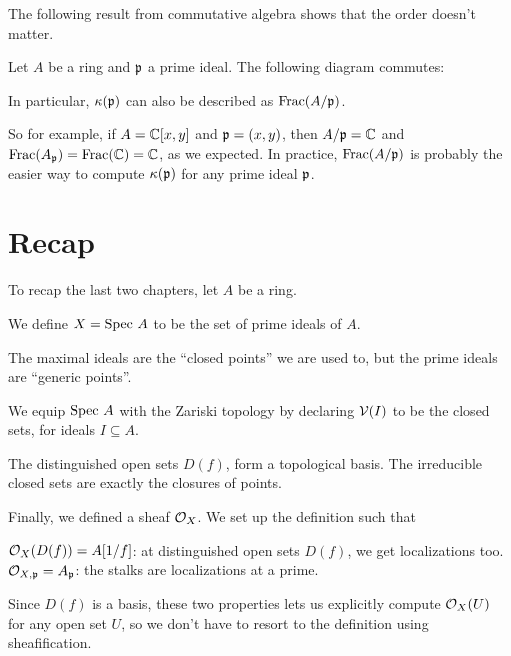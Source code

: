 The following result from commutative algebra
shows that the order doesn't matter.
\begin{theorem}
	Let $A$ be a ring and $\mathfrak p$ a prime ideal.
	The following diagram commutes:
	\begin{center}
	\end{center}
	In particular, $\kappa(\mathfrak p)$
	can also be described as $\operatorname{Frac}(A/\mathfrak p)$.
\end{theorem}
So for example, if $A = \mathbb C[x,y]$ and $\mathfrak p = (x,y)$,
then $A/\mathfrak p = \mathbb C$ and $\operatorname{Frac}(A_\mathfrak p) = \operatorname{Frac}(\mathbb C) = \mathbb C$, as we expected.
In practice, $\operatorname{Frac}(A/\mathfrak p)$ is probably the easier way
to compute $\kappa(\mathfrak p)$ for any prime ideal $\mathfrak p$.



\section{Recap}
To recap the last two chapters, let $A$ be a ring.
\begin{itemize}
	\ii We define $X = \text{Spec } A$ to be the set of prime ideals of $A$.
	\begin{itemize}
		\ii The maximal ideals are the ``closed points'' we are used to,
		but the prime ideals are ``generic points''.
	\end{itemize}

	\ii We equip $\text{Spec } A$ with the Zariski topology by declaring
	$\mathcal V(I)$ to be the closed sets, for ideals $I \subseteq A$.
	\begin{itemize}
		\ii The distinguished open sets $D(f)$,
		form a topological basis.
		\ii The irreducible closed sets are exactly the closures of points.
	\end{itemize}

	\ii Finally, we defined a sheaf $\mathcal O_X$.
	We set up the definition such that
	\begin{itemize}
		\ii $\mathcal O_{X}(D(f)) = A[1/f]$:
		at distinguished open sets $D(f)$,
		we get localizations too.
		\ii $\mathcal O_{X,\mathfrak p} = A_\mathfrak p$:
		the stalks are localizations at a prime.
	\end{itemize}
	Since $D(f)$ is a basis,
	these two properties lets us explicitly compute $\mathcal O_X(U)$
	for any open set $U$,
	so we don't have to resort to the definition using sheafification.
\end{itemize}

